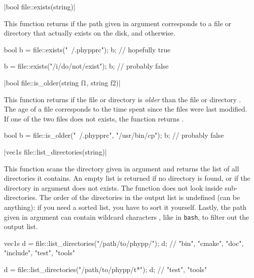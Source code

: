 \funcitem \vectorfunc \cppinline|bool file::exists(string)| 

This function returns \cpptrue if the path given in argument corresponds to a file or directory that actually exists on the disk, and \cppfalse otherwise.

\begin{example}
\begin{cppcode}
bool b = file::exists("~/.phypprc");
b; // hopefully true

b = file::exists("/i/do/not/exist");
b; // probably false
\end{cppcode}
\end{example}

\funcitem \cppinline|bool file::is_older(string f1, string f2)| 

This function returns \cpptrue if the file or directory  is \emph{older} than the file or directory . The age of a file corresponds to the time spent since the files were last modified. If one of the two files does not exists, the function returns \cppfalse.

\begin{example}
\begin{cppcode}
bool b = file::is_older("~/.phypprc", "/usr/bin/cp");
b; // probably false
\end{cppcode}
\end{example}

\funcitem \cppinline|vec1s file::list_directories(string)| 

This function scans the directory given in argument and returns the list of all directories it contains. An empty list is returned if no directory is found, or if the directory in argument does not exists. The function does not look inside sub-directories. The order of the directories in the output list is undefined (can be anything): if you need a sorted list, you have to sort it yourself. Lastly, the path given in argument can contain wildcard characters \cppinline{*}, like in \texttt{bash}, to filter out the output list.

\begin{example}
\begin{cppcode}
vec1s d = file::list_directories("/path/to/phypp/");
d; // {"bin", "cmake", "doc", "include", "test", "tools"}

d = file::list_directories("/path/to/phypp/t*");
d; // {"test", "tools"}
\end{cppcode}
\end{example}

